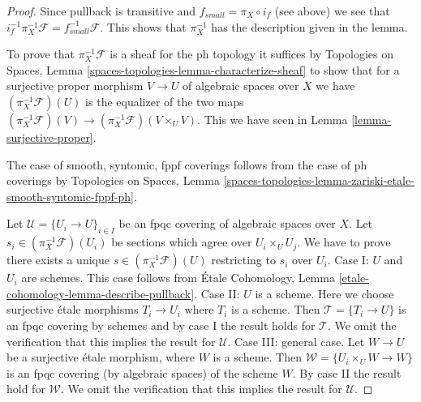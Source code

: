 \documentclass{stacks-project}
\theoremstyle{plain}
\theoremstyle{definition}
\theoremstyle{remark}
\numberwithin{equation}{subsection}
\begin{document}
\begin{proof}
Since pullback is transitive and $f_{small} = \pi_X \circ i_f$
(see above) we see that
$i_f^{-1} \pi_X^{-1}\mathcal{F} = f_{small}^{-1}\mathcal{F}$.
This shows that $\pi_X^{-1}$ has the description given in the lemma.

\medskip\noindent
To prove that $\pi_X^{-1}\mathcal{F}$ is a sheaf for the ph topology
it suffices by Topologies on Spaces, Lemma
\ref{spaces-topologies-lemma-characterize-sheaf}
to show that for a surjective proper morphism
$V \to U$ of algebraic spaces over $X$ we have
$(\pi_X^{-1}\mathcal{F})(U)$ is the equalizer of the two maps
$(\pi_X^{-1}\mathcal{F})(V) \to (\pi_X^{-1}\mathcal{F})(V \times_U V)$.
This we have seen in Lemma \ref{lemma-surjective-proper}.

\medskip\noindent
The case of smooth, syntomic, fppf coverings follows from the case
of ph coverings by Topologies on Spaces, Lemma
\ref{spaces-topologies-lemma-zariski-etale-smooth-syntomic-fppf-ph}.

\medskip\noindent
Let $\mathcal{U} = \{U_i \to U\}_{i \in I}$ be an fpqc covering of algebraic
spaces over $X$. Let $s_i \in (\pi_X^{-1}\mathcal{F})(U_i)$ be sections
which agree over $U_i \times_U U_j$. We have to prove there exists a unique
$s \in (\pi_X^{-1}\mathcal{F})(U)$ restricting to $s_i$ over $U_i$.
Case I: $U$ and $U_i$ are schemes. This case follows from
\'Etale Cohomology, Lemma \ref{etale-cohomology-lemma-describe-pullback}.
Case II: $U$ is a scheme. Here we choose surjective \'etale morphisms
$T_i \to U_i$ where $T_i$ is a scheme. Then $\mathcal{T} = \{T_i \to U\}$ is an
fpqc covering by schemes and by case I the result holds for $\mathcal{T}$.
We omit the verification that this implies the result for $\mathcal{U}$.
Case III: general case. Let $W \to U$ be a surjective \'etale
morphism, where $W$ is a scheme. Then $\mathcal{W} = \{U_i \times_U W \to W\}$
is an fpqc covering (by algebraic spaces) of the scheme $W$.
By case II the result hold for $\mathcal{W}$.
We omit the verification that this implies the result for $\mathcal{U}$.
\end{proof}
\end{document}
